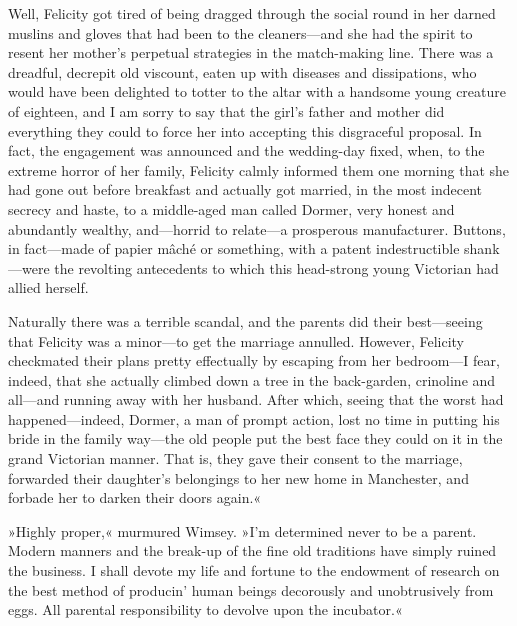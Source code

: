 Well, Felicity got tired of being dragged through the social round in her darned muslins and gloves that had been to the cleaners\allowbreak---\allowbreak and she had the spirit to resent her mother's perpetual strategies in the match-making line. There was a dreadful, decrepit old viscount, eaten up with diseases and dissipations, who would have been delighted to totter to the altar with a handsome young creature of eighteen, and I am sorry to say that the girl's father and mother did everything they could to force her into accepting this disgraceful proposal. In fact, the engagement was announced and the wedding-day fixed, when, to the extreme horror of her family, Felicity calmly informed them one morning that she had gone out before breakfast and actually got married, in the most indecent secrecy and haste, to a middle-aged man called Dormer, very honest and abundantly wealthy, and\allowbreak---\allowbreak horrid to relate\allowbreak---\allowbreak a prosperous manufacturer. Buttons, in fact\allowbreak---\allowbreak made of papier mâché or something, with a patent indestructible shank\allowbreak---\allowbreak were the revolting antecedents to which this head-strong young Victorian had allied herself.

Naturally there was a terrible scandal, and the parents did their best\allowbreak---\allowbreak seeing that Felicity was a minor\allowbreak---\allowbreak to get the marriage annulled. However, Felicity checkmated their plans pretty effectually by escaping from her bedroom\allowbreak---\allowbreak I fear, indeed, that she actually climbed down a tree in the back-garden, crinoline and all\allowbreak---\allowbreak and running away with her husband. After which, seeing that the worst had happened\allowbreak---\allowbreak indeed, Dormer, a man of prompt action, lost no time in putting his bride in the family way\allowbreak---\allowbreak the old people put the best face they could on it in the grand Victorian manner. That is, they gave their consent to the marriage, forwarded their daughter's belongings to her new home in Manchester, and forbade her to darken their doors again.«

»Highly proper,« murmured Wimsey. »I'm determined never to be a parent. Modern manners and the break-up of the fine old traditions have simply ruined the business. I shall devote my life and fortune to the endowment of research on the best method of producin' human beings decorously and unobtrusively from eggs. All parental responsibility to devolve upon the incubator.«

